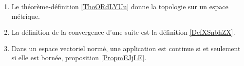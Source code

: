 \begin{enumerate}
    \item
        Le théorème-définition \ref{ThoORdLYUu} donne la topologie sur un espace métrique.
    \item
        La définition de la convergence d'une suite est la définition \ref{DefXSnbhZX}. 
    \item
        Dans un espace vectoriel normé, une application est continue si et seulement si elle est bornée, proposition \ref{PropmEJjLE}.
\end{enumerate}

